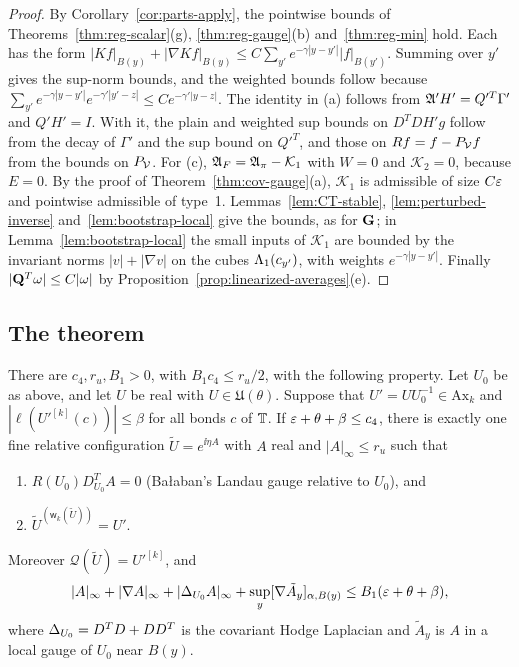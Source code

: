 \begin{proof}
By Corollary~\ref{cor:parts-apply}, the pointwise bounds of Theorems~\ref{thm:reg-scalar}(g), \ref{thm:reg-gauge}(b) and~\ref{thm:reg-min} hold. Each has the form $|Kf|_{B(y)}+|\nabla Kf|_{B(y)}\le C\sum_{y'}e^{-\gamma|y-y'|}|f|_{B(y')}$. Summing over $y'$ gives the sup-norm bounds, and the weighted bounds follow because $\sum_{y'}e^{-\gamma|y-y'|}e^{-\gamma'|y'-z|}\le Ce^{-\gamma'|y-z|}$. The identity in (a) follows from $\mathfrak A'H'=Q'^T\Gamma'$ and $Q'H'=I$. With it, the plain and weighted sup bounds on $D^TDH'g$ follow from the decay of $\Gamma'$ and the sup bound on $Q'^T$, and those on $Rf=f-P_\mathcal V f$ from the bounds on $P_\mathcal V$. For (c), $\mathfrak A_F=\mathfrak A_\pi-\mathcal K_1$ with $W=0$ and $\mathcal K_2=0$, because $E=0$. By the proof of Theorem~\ref{thm:cov-gauge}(a), $\mathcal K_1$ is admissible of size $C\varepsilon$ and pointwise admissible of type~1. Lemmas~\ref{lem:CT-stable}, \ref{lem:perturbed-inverse} and~\ref{lem:bootstrap-local} give the bounds, as for $\mathbf G$; in Lemma~\ref{lem:bootstrap-local} the small inputs of $\mathcal K_1$ are bounded by the invariant norms $|v|+|\nabla v|$ on the cubes $\Lambda_1(c_{y'})$, with weights $e^{-\gamma|y-y'|}$. Finally $|\mathbf Q^T\omega|\le C|\omega|$ by Proposition~\ref{prop:linearized-averages}(e).
\end{proof}

\subsection{The theorem}\label{ss:24.2}

\begin{theorem}\label{thm:chart}
There are $c_4,r_u,B_1>0$, with $B_1c_4\le r_u/2$, with the following property. Let $U_0$ be as above, and let $U$ be real with $U\in\mathfrak U(\theta)$. Suppose that $U'=UU_0^{-1}\in\mathrm{Ax}_k$ and $|\ell(U'^{[k]}(c))|\le\beta$ for all bonds $c$ of $\mathbb T$. If $\varepsilon+\theta+\beta\le c_4$, there is exactly one fine relative configuration $\tilde U=e^{\ii\eta A}$ with $A$ real and $|A|_\infty\le r_u$ such that
\begin{enumerate}[label=(\roman*)]
\item $R(U_0)D^T_{U_0}A=0$ (Ba\l aban's Landau gauge relative to $U_0$), and
\item $\tilde U^{(\mathsf w_k(\tilde U))}=U'$.
\end{enumerate}
Moreover $\mathcal Q(\tilde U)=U'^{[k]}$, and
\[
|A|_\infty+|\nabla A|_\infty+|\Delta_{U_0}A|_\infty+\sup_y[\nabla\tilde A_y]_{\alpha,B(y)}\le B_1(\varepsilon+\theta+\beta),
\]
where $\Delta_{U_0}=D^TD+DD^T$ is the covariant Hodge Laplacian and $\tilde A_y$ is $A$ in a local gauge of $U_0$ near $B(y)$.
\end{theorem}


